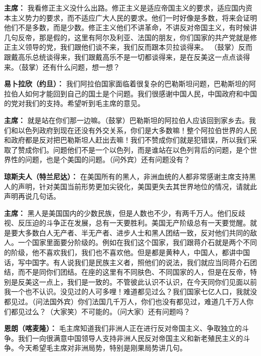 \begin{duihua}
\item[\textbf{主席：}] 我看修正主义没什么出路。修正主义是适应帝国主义的要求，适应国内资本主义势力的要求，而不适应广大人民的要求。他们一时好像是多数，将来会证明他们不是多数，而是少数。修正主义他们不讲革命，不讲反对帝国主义，有时候讲几句反帝，那是假的，这里有阿尔及利亚、法国的朋友，你们国家的共产党就是修正主义领导的党，我们跟他们谈不来，我们反而跟本贝拉谈得来。 （鼓掌）反而跟戴高乐总统谈得来，我们跟戴高乐不是一切都谈得来，是在反美这一点点谈得来。（鼓掌）还有什么问题，想一想？

\item[\textbf{易卜拉欣（约旦）：}] 我们阿拉伯国家面临着很复杂的巴勒斯坦问题，巴勒斯坦的阿拉伯人如何才能回到自己的国土是个问题。我们很感谢中国人民，中国政府和中国的党对我们的支持。希望听到毛主席的意见。

\item[\textbf{主席：}] 就是站在你们那一边嘛。（鼓掌）巴勒斯坦的阿拉伯人应该回到家乡去。我们和以色列政府到现在还没有外交关系，你们是大多数嘛！整个阿拉伯世界的人民和政府都是反对把巴勒斯坦人赶出去嘛！我们不赞成你们就是犯错误，所以我们采取了赞成你们。问题他们不是一个以色列，而是谁站在以色列背后的问题，是个世界性的问题，也是个美国的问题。（问外宾）还有问题没有？

\item[\textbf{琼斯夫人（特兰尼达）：}] 在美国所有的黑人，非洲血统的人都非常感谢主席支持黑人的声明，针对美国当前形势更加尖锐化，美国更失去其世界地位的情况，请就此声明再说几句话。

\item[\textbf{主席：}] 黑人是美国国内的少数民族，但是人数也不少，有两千万人。他们反歧视、反压迫的斗争正在发展，总有一天要胜利。美国无产阶级总有一天要觉醒。就是要大多数白人无产者、半无产者、进步人士和黑人团结一致，反对他们共同的敌人。一个国家里面要分阶级的。例如在我们这个国家，我们跟蒋介石就是两个不同的阶级，他不喜欢我们，我们也不喜欢他。但是都是黄种人，中国人，都讲中国话，写中国字。有人说我们是民族主义者，照他们的说法，我们就应当同蒋介石团结，而不是同你们团结。在座的这里有不同肤色、不同国家的人，但是在反帝，特别是反美这一点上，我们是一致的。不管彼此认识不认识，在今天同你们见面以前我一个也不认识。没见过的人可多哩！难道都见过么？我们国家七亿人口，我就没都见过。（问法国外宾）你们法国几千万人，你们也没有都见过，难道几千万人你们都见过么？（大家笑）不可能的。（问大家）还有问题吗？

\item[\textbf{恩朗（喀麦隆）：}] 毛主席知道我们非洲人正在进行反对帝国主义、争取独立的斗争。我们一向很满意中国领导人支持非洲人民反对帝国主义和新老殖民主义的斗争。今天希望毛主席对非洲局势，特别是刚果局势讲几句。


\end{duihua}
